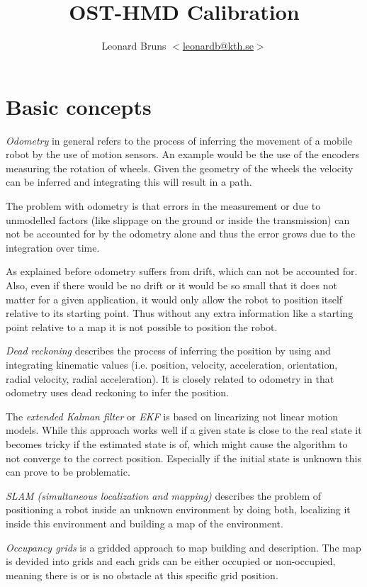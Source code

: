 \documentclass[11pt,a4paper]{article}
\author{Leonard Bruns $<$\href{mailto:leonardb@kth.se} {leonardb@kth.se}$>$}
\title{OST-HMD Calibration}
\begin{document}
	\maketitle
	\tableofcontents
	\section{Basic concepts}
	\emph{Odometry} in general refers to the process of inferring the movement of a mobile robot by the use of motion sensors. An example would be the use of the encoders measuring the rotation of wheels. Given the geometry of the wheels the velocity can be inferred and integrating this will result in a path.
	
	The problem with odometry is that errors in the measurement or due to unmodelled factors (like slippage on the ground or inside the transmission) can not be accounted for by the odometry alone and thus the error grows due to the integration over time.
	
	As explained before odometry suffers from drift, which can not be accounted for. Also, even if there would be no drift or it would be so small that it does not matter for a given application, it would only allow the robot to position itself relative to its starting point. Thus without any extra information like a starting point relative to a map it is not possible to position the robot.
	
	\emph{Dead reckoning} describes the process of inferring the position by using and integrating kinematic values (i.e. position, velocity, acceleration, orientation, radial velocity, radial acceleration). It is closely related to odometry in that odometry uses dead reckoning to infer the position.
	
	The \emph{extended Kalman filter} or \emph{EKF} is based on linearizing not linear motion models. While this approach works well if a given state is close to the real state it becomes tricky if the estimated state is of, which might cause the algorithm to not converge to the correct position. Especially if the initial state is unknown this can prove to be problematic.
	
	\emph{SLAM (simultaneous localization and mapping)} describes the problem of positioning a robot inside an unknown environment by doing both, localizing it inside this environment and building a map of the environment. 
	
	\emph{Occupancy grids} is a gridded approach to map building and description. The map is devided into grids and each grids can be either occupied or non-occupied, meaning there is or is no obstacle at this specific grid position.
	
\end{document}
